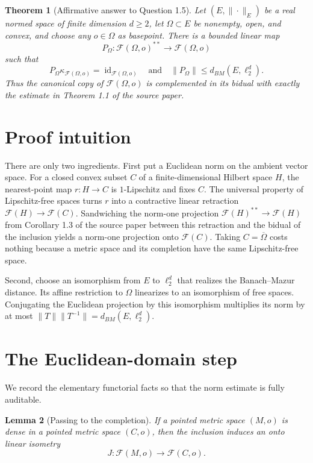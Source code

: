 \documentclass[11pt]{article}
\newtheorem{theorem}{Theorem}[section]
\newtheorem{lemma}[theorem]{Lemma}
\newcommand{\F}{\mathcal F}
\newcommand{\id}{\operatorname{id}}
\begin{document}
\begin{theorem}[Affirmative answer to Question 1.5]\label{thm:main}
Let $(E,\|\cdot\|_E)$ be a real normed space of finite dimension $d\geq 2$,
let $\Omega\subset E$ be nonempty, open, and convex, and choose any
$o\in\Omega$ as basepoint.  There is a bounded linear map
\[
 P_\Omega:\F(\Omega,o)^{**}\longrightarrow \F(\Omega,o)
\]
such that
\[
 P_\Omega\kappa_{\F(\Omega,o)}=\id_{\F(\Omega,o)}
 \quad\text{and}\quad
 \|P_\Omega\|\leq d_{BM}(E,\ell_2^d).
\]
Thus the canonical copy of $\F(\Omega,o)$ is complemented in its bidual
with exactly the estimate in Theorem 1.1 of the source paper.
\end{theorem}

\section{Proof intuition}

There are only two ingredients.  First put a Euclidean norm on the ambient
vector space.  For a closed convex subset $C$ of a finite-dimensional Hilbert
space $H$, the nearest-point map $r:H\to C$ is $1$-Lipschitz and fixes $C$.
The universal property of Lipschitz-free spaces turns $r$ into a contractive
linear retraction $\F(H)\to\F(C)$.  Sandwiching the norm-one projection
$\F(H)^{**}\to\F(H)$ from Corollary 1.3 of the source paper between this
retraction and the bidual of the inclusion yields a norm-one projection onto
$\F(C)$.  Taking $C=\overline\Omega$ costs nothing because a metric space and
its completion have the same Lipschitz-free space.

Second, choose an isomorphism from $E$ to $\ell_2^d$ that realizes the
Banach--Mazur distance.  Its affine restriction to $\Omega$ linearizes to an
isomorphism of free spaces.  Conjugating the Euclidean projection by this
isomorphism multiplies its norm by at most
$\|T\|\|T^{-1}\|=d_{BM}(E,\ell_2^d)$.

\section{The Euclidean-domain step}

We record the elementary functorial facts so that the norm estimate is fully
auditable.

\begin{lemma}[Passing to the completion]\label{lem:completion}
If a pointed metric space $(M,o)$ is dense in a pointed metric space
$(C,o)$, then the inclusion induces an onto linear isometry
\[
 J:\F(M,o)\longrightarrow \F(C,o).
\]
\end{lemma}
\end{document}
